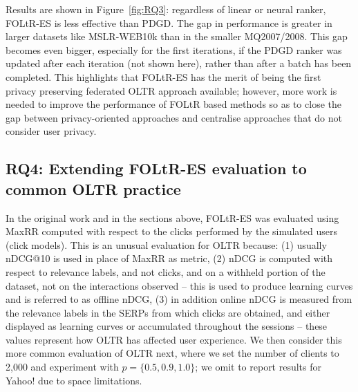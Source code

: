 Results are shown in Figure~\ref{fig:RQ3}: regardless of linear or neural ranker, FOLtR-ES is less effective than PDGD. The gap in performance is greater in larger datasets like MSLR-WEB10k than in the smaller MQ2007/2008. This gap becomes even bigger, especially for the first iterations, if the PDGD ranker was updated after each iteration (not shown here), rather than after a batch has been completed. This highlights that FOLtR-ES has the merit of being the first privacy preserving federated OLTR approach available; however, more work is needed to improve the performance of FOLtR based methods so as to close the gap between privacy-oriented approaches and centralise approaches that do not consider user privacy.

\subsection{RQ4: Extending FOLtR-ES evaluation to common OLTR practice}
In the original work and in the sections above, FOLtR-ES was evaluated using MaxRR computed with respect to the clicks performed by the simulated users (click models). This is an unusual evaluation for OLTR because: (1) usually nDCG@10 is used in place of MaxRR as metric, (2) nDCG is computed with respect to relevance labels, and not clicks, and on a withheld portion of the dataset, not on the interactions observed -- this is used to produce learning curves and is referred to as offline nDCG, (3) in addition online nDCG is measured from the relevance labels in the SERPs from which clicks are obtained, and either displayed as learning curves or accumulated throughout the sessions -- these values represent how OLTR has affected user experience. We then consider this more common evaluation of OLTR next, where we set the number of clients to 2,000 and experiment with $p=\{0.5, 0.9, 1.0\}$; we omit to report results for Yahoo! due to space limitations. 

